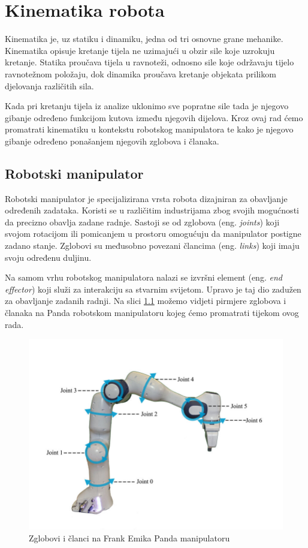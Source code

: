 \documentclass[times, utf8, diplomskirad]{fer}
\begin{document}
\chapter{Kinematika robota}
Kinematika je, uz statiku i dinamiku, jedna od tri osnovne grane mehanike.
Kinematika opisuje kretanje tijela ne uzimajući u obzir sile koje uzrokuju kretanje.
Statika proučava tijela u ravnoteži, odnosno sile koje održavaju tijelo ravnotežnom položaju, dok dinamika proučava kretanje objekata prilikom djelovanja različitih sila.

Kada pri kretanju tijela iz analize uklonimo sve popratne sile tada je njegovo gibanje određeno funkcijom kutova između njegovih dijelova.
Kroz ovaj rad ćemo promatrati kinematiku u kontekstu robotskog manipulatora te kako je njegovo gibanje određeno ponašanjem njegovih zglobova i članaka.

\section{Robotski manipulator}
Robotski manipulator je specijalizirana vrsta robota dizajniran za obavljanje određenih zadataka.
Koristi se u različitim industrijama zbog svojih mogućnosti da precizno obavlja zadane radnje.
Sastoji se od zglobova (eng. \textit{joints}) koji svojom rotacijom ili pomicanjem u prostoru omogućuju da manipulator postigne zadano stanje.
Zglobovi su međusobno povezani člancima (eng. \textit{links}) koji imaju svoju određenu duljinu.

Na samom vrhu robotskog manipulatora nalazi se izvršni element (eng. \textit{end effector}) koji služi za interakciju sa stvarnim svijetom.
Upravo je taj dio zadužen za obavljanje zadanih radnji.
Na slici \ref{fig:panda-zglob} možemo vidjeti pirmjere zglobova i članaka na Panda robotskom manipulatoru kojeg ćemo promatrati tijekom ovog rada.
\begin{figure}[H]
    \centering
    \includegraphics[width=12cm]{img/panda-links-and-joints}
    \caption{Zglobovi i članci na Frank Emika Panda manipulatoru\protect\footnotemark}
    \label{fig:panda-zglob}
\end{figure}
\end{document}
